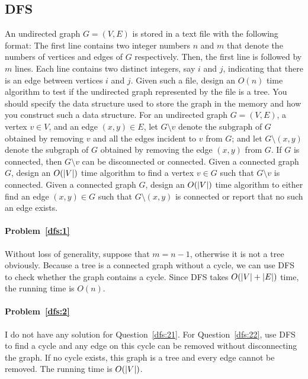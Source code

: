 \subsection{DFS}
\begin{Exercise}

\Question An undirected graph $G = (V, E)$ is stored in a text file with the following format: The first line contains two integer numbers $n$ and $m$ that denote the numbers of vertices and edges of $G$ respectively. Then, the first line is followed by $m$ lines. Each line contains two distinct integers, say $i$ and $j$, indicating that there is an edge between vertices $i$ and $j$. Given such a file, design an $O(n)$ time algorithm to test if the undirected graph represented by the file is a tree. You should specify the data structure used to store the graph in the memory and how you construct such a data structure.   \label{dfs:1}
\Question For an undirected graph $G = (V, E)$, a vertex $v \in V$, and an edge $(x, y) \in E$, let $G\setminus v$ denote the subgraph of $G$ obtained by removing $v$ and all the edges incident to $v$ from $G$; and let $G\setminus(x, y)$ denote the subgraph of $G$ obtained by removing the edge $(x, y)$ from $G$. If $G$ is connected, then $G\setminus v$ can be disconnected or connected. \label{dfs:2}
\subQuestion Given a connected graph $G$, design an $O(\lvert V\rvert)$ time algorithm to find a vertex $v \in G$ such that $G\setminus v$ is connected. \label{dfs:21}
\subQuestion Given a connected graph $G$, design an $O(\lvert V\rvert)$ time algorithm to either find an edge $(x, y) \in G$ such that $G\setminus (x, y)$  is connected or report that no such an edge exists.  \label{dfs:22}
\end{Exercise}
\begin{Answer}

\paragraph{Problem~\ref{dfs:1}}
Without loss of generality, suppose that $m = n-1$, otherwise it is not a tree obviously. Because a tree is a connected graph without a cycle, we can use DFS to check whether the graph contains a cycle. Since DFS takes $O(\lvert V\rvert + \lvert E\rvert)$ time, the running time is $O(n)$.

\paragraph{Problem~\ref{dfs:2}}
I do not have any solution for Question~\ref{dfs:21}. For Question~\ref{dfs:22}, use DFS to find a cycle and any edge on this cycle can be removed without disconnecting the graph. If no cycle exists, this graph is a tree and every edge cannot be removed. The running time is $O(\lvert V\rvert)$.
\end{Answer}

